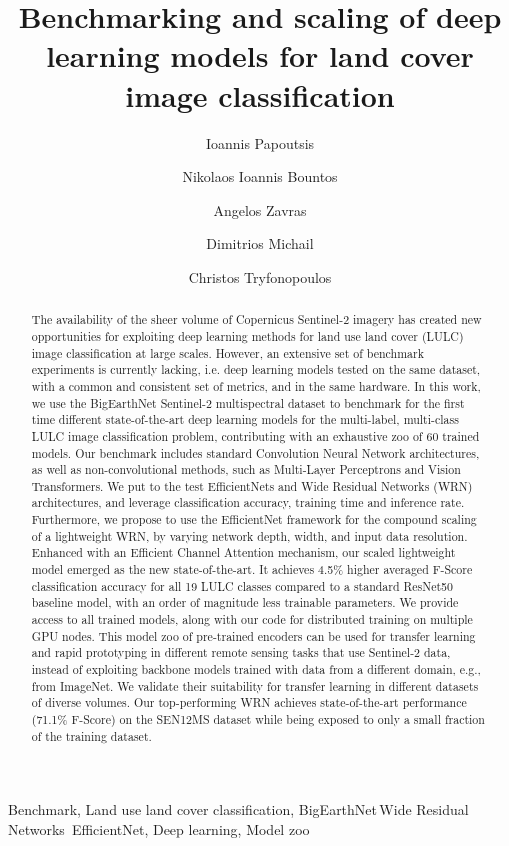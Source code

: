 \documentclass[journal]{IEEEtran}
\begin{document}
\title{Benchmarking and scaling of deep learning models for land cover image classification}

\author[1]{Ioannis Papoutsis}
\author[12]{Nikolaos Ioannis Bountos}
\author[1]{Angelos Zavras}
\author[2]{Dimitrios Michail}
\author[3]{Christos Tryfonopoulos}



\maketitle

\begin{abstract}
The availability of the sheer volume of Copernicus Sentinel-2 imagery has created new opportunities for exploiting deep learning methods for land use land cover (LULC) image classification at large scales.
However, an extensive set of benchmark experiments is currently lacking, i.e. deep learning models tested on the same dataset, with a common and consistent set of metrics, and in the same hardware.
In this work, we use the BigEarthNet Sentinel-2 multispectral dataset to benchmark for the first time different state-of-the-art deep learning models for the multi-label, multi-class LULC image classification problem, contributing with an exhaustive zoo of 60 trained models.    
Our benchmark includes standard Convolution Neural Network architectures, as well as non-convolutional methods, such as Multi-Layer Perceptrons and Vision Transformers. We put to the test EfficientNets and Wide Residual Networks (WRN) architectures, and leverage classification accuracy, training time and inference rate. 
Furthermore, we propose to use the EfficientNet framework for the compound scaling of a lightweight WRN, by varying network depth, width, and input data resolution. Enhanced with an Efficient Channel Attention mechanism, our scaled lightweight model emerged as the new state-of-the-art. It achieves  4.5\% higher averaged F-Score classification accuracy for all 19 LULC classes compared to a standard ResNet50 baseline model, with an order of magnitude less trainable parameters. We provide access to all trained models, along with our code for distributed training on multiple GPU nodes. This model zoo of pre-trained encoders can be used for transfer learning and rapid prototyping in different remote sensing tasks that use Sentinel-2 data, instead of exploiting backbone models trained with data from a different domain, e.g., from ImageNet. We validate their suitability for transfer learning in different datasets of diverse volumes. Our top-performing WRN achieves state-of-the-art performance (71.1\% F-Score) on the SEN12MS dataset while being exposed to only a small fraction of the training dataset.
\end{abstract}
\begin{IEEEkeywords}
Benchmark, Land use land cover classification,  BigEarthNet\,Wide Residual Networks\, EfficientNet, Deep learning, Model zoo
\end{IEEEkeywords}
\end{document}
